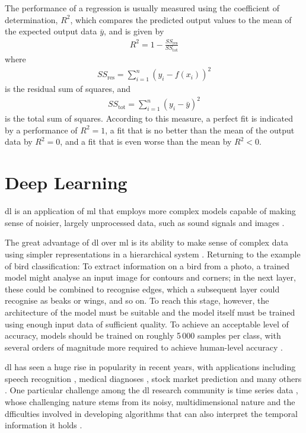 The performance of a regression is usually measured using the coefficient of determination, \(R^2\), which compares the predicted output values to the mean of the expected output data \(\bar{y}\), and is given by
\begin{align}
    R^2 = 1 - \frac{SS_{\text{res}}}{SS_{\text{tot}}}
\end{align}
where
\begin{align}
    SS_{\text{res}} = \sum_{i=1}^{n}{\left(y_i - f(x_i)\right)}^2
\end{align}
is the residual sum of squares, and
\begin{align}
    SS_{\text{tot}} = \sum_{i=1}^{n}{\left(y_i - \bar{y}\right)}^2
\end{align}
is the total sum of squares. According to this measure, a perfect fit is indicated by a performance of \(R^2 = 1\), a fit that is no better than the mean of the output data by \(R^2 = 0\), and a fit that is even worse than the mean by \(R^2 < 0\).

\section{Deep Learning}
\ac{dl} is an application of \ac{ml} that employs more complex models capable of making sense of noisier, largely unprocessed data, such as sound signals and images \cite[]{goodfellow_deep_2016}.

The great advantage of \ac{dl} over \ac{ml} is its ability to make sense of complex data using simpler representations in a hierarchical system \cite[]{goodfellow_deep_2016}. Returning to the example of bird classification: To extract information on a bird from a photo, a trained model might analyse an input image for contours and corners; in the next layer, these could be combined to recognise edges, which a subsequent layer could recognise as beaks or wings, and so on. To reach this stage, however, the architecture of the model must be suitable and the model itself must be trained using enough input data of sufficient quality. To achieve an acceptable level of accuracy, models should be trained on roughly 5\,000 samples per class, with several orders of magnitude more required to achieve human-level accuracy \cite[p. 20]{goodfellow_deep_2016}.

\ac{dl} has seen a huge rise in popularity in recent years, with applications including speech recognition \cite[]{deng_machine_2013}, medical diagnoses \cite[]{lee_diagnosis_2018}, stock market prediction \cite[]{krollner_financial_2010} and many others \cite[]{kelleher_fundamentals_2015}. One particular challenge among the \ac{dl} research community is time series data \cite[]{yang_10_2006}, whose challenging nature stems from its noisy, multidimensional nature \cite[]{kelleher_fundamentals_2015} and the dfficulties involved in developing algorithms that can also interpret the temporal information it holds \cite[]{bagnall_great_2017}.

